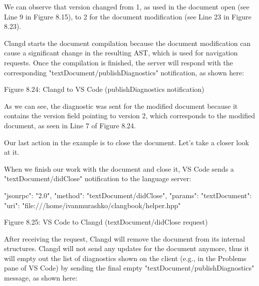 We can observe that version changed from 1, as used in the document open (see Line 9 in Figure 8.15), to 2 for the document modification (see Line 23 in Figure 8.23).

Clangd starts the document compilation because the document modification can cause a significant change in the resulting AST, which is used for navigation requests. Once the compilation is finished, the server will respond with the corresponding "textDocument/publishDiagnostics" notification, as shown here:

\begin{shell}
{
  "jsonrpc": "2.0",
  "method": "textDocument/publishDiagnostics",
  "params": {
    "diagnostics": [],
    "uri": "file:///home/ivanmurashko/clangbook/helper.hpp",
     "version": 2
}
\end{shell}


\begin{center}
Figure 8.24: Clangd to VS Code (publishDiagnostics notification)
\end{center}

As we can see, the diagnostic was sent for the modified document because it contains the version field pointing to version 2, which corresponds to the modified document, as seen in Line 7 of Figure 8.24.

Our last action in the example is to close the document. Let's take a closer look at it.


When we finish our work with the document and close it, VS Code sends a "textDocument/didClose" notification to the language server:

\begin{shell}
{
  "jsonrpc": "2.0",
  "method": "textDocument/didClose",
  "params": {
    "textDocument": {
      "uri": "file:///home/ivanmurashko/clangbook/helper.hpp"
    }
  }
}
\end{shell}

\begin{center}
Figure 8.25: VS Code to Clangd (textDocument/didClose request)
\end{center}

After receiving the request, Clangd will remove the document from its internal structures. Clangd will not send any updates for the document anymore, thus it will empty out the list of diagnostics shown on the client (e.g., in the Problems pane of VS Code) by sending the final empty "textDocument/publishDiagnostics" message, as shown here:

